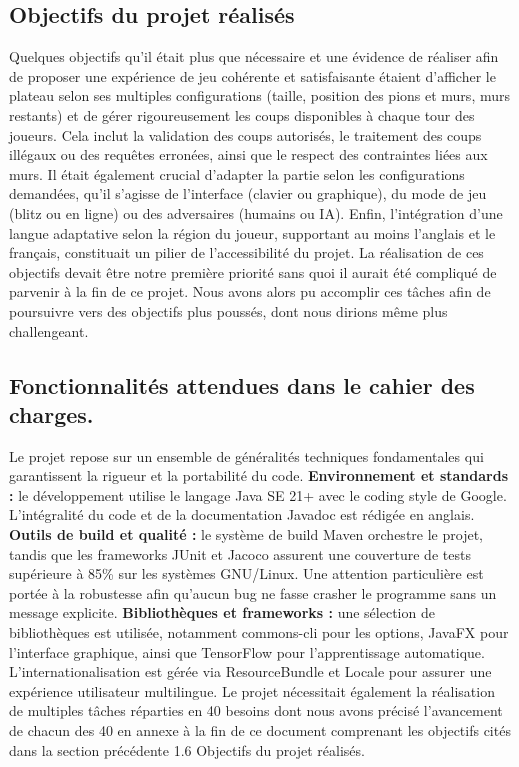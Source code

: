 \documentclass[a4paper]{article}
\begin{document}
\subsection{Objectifs du projet réalisés}

Quelques objectifs qu’il était plus que nécessaire et une évidence de réaliser afin de proposer une expérience de jeu cohérente et satisfaisante étaient d'afficher le plateau selon ses multiples configurations (taille, position des pions et murs, murs restants) et de gérer rigoureusement les coups disponibles à chaque tour des joueurs. Cela inclut la validation des coups autorisés, le traitement des coups illégaux ou des requêtes erronées, ainsi que le respect des contraintes liées aux murs. Il était également crucial d'adapter la partie selon les configurations demandées, qu'il s'agisse de l'interface (clavier ou graphique), du mode de jeu (blitz ou en ligne) ou des adversaires (humains ou IA). Enfin, l'intégration d'une langue adaptative selon la région du joueur, supportant au moins l'anglais et le français, constituait un pilier de l'accessibilité du projet.
La réalisation de ces objectifs devait être notre première priorité sans quoi il aurait été compliqué de parvenir à la fin de ce projet. Nous avons alors pu accomplir ces tâches afin de poursuivre vers des objectifs plus poussés, dont nous dirions même plus challengeant.



\subsection{Fonctionnalités attendues dans le cahier des charges.}

Le projet repose sur un ensemble de généralités techniques fondamentales qui garantissent la rigueur et la portabilité du code. \textbf{Environnement et standards :} le développement utilise le langage Java SE 21+ avec le coding style de Google. L'intégralité du code et de la documentation Javadoc est rédigée en anglais. \textbf{Outils de build et qualité :} le système de build Maven orchestre le projet, tandis que les frameworks JUnit et Jacoco assurent une couverture de tests supérieure à 85\% sur les systèmes GNU/Linux. Une attention particulière est portée à la robustesse afin qu'aucun bug ne fasse crasher le programme sans un message explicite. \textbf{Bibliothèques et frameworks :} une sélection de bibliothèques est utilisée, notamment commons-cli pour les options, JavaFX pour l'interface graphique, ainsi que TensorFlow pour l'apprentissage automatique. L'internationalisation est gérée via ResourceBundle et Locale pour assurer une expérience utilisateur multilingue.
Le projet nécessitait également la réalisation de multiples tâches réparties en 40 besoins dont nous avons précisé l’avancement de chacun des 40 en annexe à la fin de ce document comprenant les objectifs cités dans la section précédente 1.6 Objectifs du projet réalisés.
\end{document}
